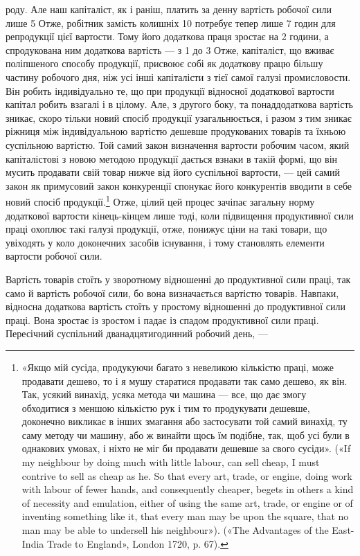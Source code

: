 роду. Але наш капіталіст, як і раніш, платить за денну вартість
робочої сили лише 5 Отже, робітник замість колишніх
10 потребує тепер лише 7 годин для репродукції цієї вартости.
Тому його додаткова праця зростає на 2 години, а спродукована
ним додаткова вартість — з 1 до 3 Отже, капіталіст,
що вживає поліпшеного способу продукції, присвоює собі як додаткову працю більшу
частину робочого дня, ніж усі інші капіталісти
з тієї самої галузі промисловости. Він робить індивідуально те,
що при продукції відносної додаткової вартости капітал робить
взагалі і в цілому. Але, з другого боку, та понаддодаткова вартість
зникає, скоро тільки новий спосіб продукції узагальнюється, і
разом з тим зникає ріжниця між індивідуальною вартістю дешевше
продукованих товарів та їхньою суспільною вартістю. Той самий
закон визначення вартости робочим часом, який капіталістові
з новою методою продукції дається взнаки в такій формі, що він
мусить продавати свій товар нижче від його суспільної вартости, — цей самий
закон як примусовий закон конкуренції спонукає його конкурентів вводити в себе
новий спосіб продукції.\footnote{
«Якщо мій сусіда, продукуючи багато з невеликою кількістю праці,
може продавати дешево, то і я мушу старатися продавати так само дешево,
як він. Так, усякий винахід, усяка метода чи машина — все, що дає змогу
обходитися з меншою кількістю рук і тим то продукувати дешевше, доконечно
викликає в інших змагання або застосувати той самий винахід,
ту саму методу чи машину, або ж винайти щось їм подібне, так, щоб
усі були в однакових умовах, і ніхто не міг би продавати дешевше за свого
сусіди». («If my neighbour by doing much with little labour, can sell
cheap, I must contrive to sell as cheap as he. So that every art, trade, or
engine, doing work with labour of fewer hands, and consequently cheaper,
begets in others a kind of necessity and emulation, either of using the same
art, trade, or engine or of inventing something like it, that every man
may be upon the square, that no man may be able to undersell his neighbour»).
(«The Advantages of the East-India Trade to England», London 1720, p. 67).
} Отже, цілий цей процес зачіпає загальну норму додаткової вартости
кінець-кінцем лише тоді, коли підвищення продуктивної
сили праці охоплює такі галузі продукції, отже, понижує ціни
на такі товари, що увіходять у коло доконечних засобів існування,
і тому становлять елементи вартости робочої сили.

Вартість товарів стоїть у зворотному відношенні до продуктивної сили праці,
так само й вартість робочої сили, бо вона
визначається вартістю товарів. Навпаки, відносна додаткова
вартість стоїть у простому відношенні до продуктивної сили праці.
Вона зростає із зростом і падає із спадом продуктивної сили праці.
Пересічний суспільний дванадцятигодинний робочий день, —
\parbreak{}  %
